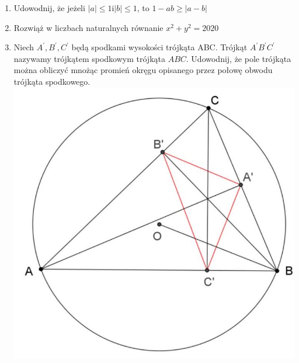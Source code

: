 \documentclass[10pt]{article}
\begin{document}
\begin{enumerate}
  \item Udowodnij, że jeżeli \(|a| \leq 1 \mathrm{i}|b| \leq 1\), to \(1-a b \geq|a-b|\)
  \item Rozwiąż w liczbach naturalnych równanie \(x^{2}+y^{2}=2020\)
  \item Niech \(A^{\prime}, B^{\prime}, C^{\prime}\) będą spodkami wysokości trójkąta ABC. Trójkąt \(A^{\prime} B^{\prime} C^{\prime}\) nazywamy trójkątem spodkowym trójkąta \(A B C\). Udowodnij, że pole trójkąta można obliczyć mnożąc promień okręgu opisanego przez połowę obwodu trójkąta spodkowego.\\
\includegraphics[max width=\textwidth, center]{2024_11_21_e1a346b5162485125e83g-1}
\end{enumerate}
\end{document}
